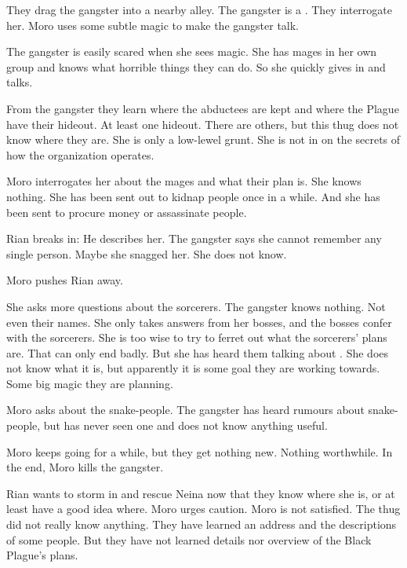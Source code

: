 They drag the gangster into a nearby alley. 
The gangster is a \sphyle. 
They interrogate her. 
Moro uses some subtle magic to make the gangster talk. 

The gangster is easily scared when she sees magic.
She has mages in her own group and knows what horrible things they can do.
So she quickly gives in and talks. 

From the gangster they learn where the abductees are kept and where the Plague have their hideout.
At least one hideout. 
There are others, but this thug does not know where they are.
She is only a low-lewel grunt. 
She is not in on the secrets of how the organization operates. 

Moro interrogates her about the mages and what their plan is.
She knows nothing. 
She has been sent out to kidnap people once in a while. 
And she has been sent to procure money or assassinate people. 

Rian breaks in: 
He describes her.
The gangster says she cannot remember any single person.
Maybe she snagged her. 
She does not know. 

Moro pushes Rian away.

She asks more questions about the sorcerers.
The gangster knows nothing. 
Not even their names. 
She only takes answers from her bosses, and the bosses confer with the sorcerers. 
She is too wise to try to ferret out what the sorcerers' plans are.
That can only end badly. 
But she has heard them talking about . 
She does not know what it is, but apparently it is some goal they are working towards. 
Some big magic they are planning. 

Moro asks about the snake-people.
The gangster has heard rumours about snake-people, but has never seen one and does not know anything useful. 



\begin{comment}
  \section{Killing the victim}
\end{comment}

Moro keeps going for a while, but they get nothing new.
Nothing worthwhile. 
In the end, Moro kills the gangster. 

Rian wants to storm in and rescue Neina now that they know where she is, or at least have a good idea where. 
Moro urges caution. 
Moro is not satisfied. 
The thug did not really know anything. 
They have learned an address and the descriptions of some people.
But they have not learned details nor overview of the Black Plague's plans. 

